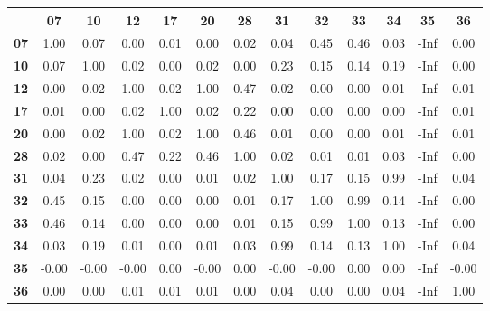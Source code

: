 \begin{tiny}\begin{tabular}{|l|c|c|c|c|c|c|c|c|c|c|c|c|}
\hline
&\textbf{07}&\textbf{10}&\textbf{12}&\textbf{17}&\textbf{20}&\textbf{28}&\textbf{31}&\textbf{32}&\textbf{33}&\textbf{34}&\textbf{35}&\textbf{36}\\\hline
\textbf{07}&1.00&0.07&0.00&0.01&0.00&0.02&0.04&0.45&0.46&0.03&-Inf&0.00\\\hline
\textbf{10}&0.07&1.00&0.02&0.00&0.02&0.00&0.23&0.15&0.14&0.19&-Inf&0.00\\\hline
\textbf{12}&0.00&0.02&1.00&0.02&1.00&0.47&0.02&0.00&0.00&0.01&-Inf&0.01\\\hline
\textbf{17}&0.01&0.00&0.02&1.00&0.02&0.22&0.00&0.00&0.00&0.00&-Inf&0.01\\\hline
\textbf{20}&0.00&0.02&1.00&0.02&1.00&0.46&0.01&0.00&0.00&0.01&-Inf&0.01\\\hline
\textbf{28}&0.02&0.00&0.47&0.22&0.46&1.00&0.02&0.01&0.01&0.03&-Inf&0.00\\\hline
\textbf{31}&0.04&0.23&0.02&0.00&0.01&0.02&1.00&0.17&0.15&0.99&-Inf&0.04\\\hline
\textbf{32}&0.45&0.15&0.00&0.00&0.00&0.01&0.17&1.00&0.99&0.14&-Inf&0.00\\\hline
\textbf{33}&0.46&0.14&0.00&0.00&0.00&0.01&0.15&0.99&1.00&0.13&-Inf&0.00\\\hline
\textbf{34}&0.03&0.19&0.01&0.00&0.01&0.03&0.99&0.14&0.13&1.00&-Inf&0.04\\\hline
\textbf{35}&-0.00&-0.00&-0.00&0.00&-0.00&0.00&-0.00&-0.00&0.00&0.00&-Inf&-0.00\\\hline
\textbf{36}&0.00&0.00&0.01&0.01&0.01&0.00&0.04&0.00&0.00&0.04&-Inf&1.00\\\hline
\end{tabular}
\end{tiny}